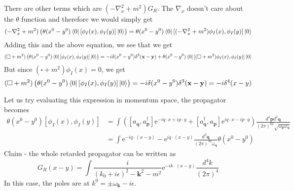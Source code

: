\documentclass[11pt]{article}
\newcommand{\e}{\mathrm{e}}
\newcommand{\w}{\omega}
\renewcommand{\a}[1]{a_\mathbf{#1}}
\newcommand{\adag}[1]{a^\dagger_\mathbf{#1}}
\numberwithin{equation}{section}
\begin{document}
    There are other terms which are \((-\nabla_x^2 + m^2) G_R\). The \(\nabla_x\) doesn't care about the \(\theta\) function and therefore we would simply get 
    \begin{equation*}
        (-\nabla_x^2 + m^2) \left(\theta(x^0 - y^0)\bra{0}[\phi_I(x), \phi_I(y) ]\ket{0}\right) = \theta(x^0 - y^0)\bra{0}[(-\nabla_x^2 + m^2)\phi_I(x), \phi_I(y) ]\ket{0}
    \end{equation*}
    Adding this and the above equation, we see that we get 
    \begin{equation*}
        (\square + m^2)\left(\theta(x^0 - y^0)\bra{0}[\phi_I(x), \phi_I(y) ]\ket{0}\right) = -i\delta(x^0 - y^0)\delta^3(\textbf{x} - \textbf{y}) + \theta(x^0 - y^0) \bra{0}[(\square + m^2)\phi_I(x), \phi_I(y) ]\ket{0}
    \end{equation*}
    But since \((\square + m^2)\phi_I(x) = 0\), we get 
    \begin{equation*}
        (\square + m^2)\left(\theta(x^0 - y^0)\bra{0}[\phi_I(x), \phi_I(y) ]\ket{0}\right) = -i\delta(x^0 - y^0)\delta^3(\textbf{x} - \textbf{y}) = -i\delta^4(x-y)
    \end{equation*}

    Let us try evaluating this expression in momentum space, the propagator becomes 
    \begin{align*}
        \theta(x^0 - y^0)[\phi_I(x), \phi_I(y)] &= \int \left(  [\a{q}, \adag{p}] \e^{-iq\cdot x + ip\cdot y} + [\adag{q}, \a{p}]\e^{iq\cdot x - ip\cdot y}  \right)\frac{d^3\textbf{p}d^3\textbf{q}}{(2\pi)^62\sqrt{\w_\textbf{p}\w_\textbf{q}}}\\
        &= \int \e^{-iq\cdot(x-y)} - \e^{iq\cdot (x-y)} \frac{d^3\textbf{q}}{(2\pi)^32\w_\textbf{q}}\theta(x^0 - y^0)
    \end{align*}
    Claim - the whole retarded propagator can be written as 
    \begin{equation*}
        G_R(x-y) = \int \frac{i}{(k_0 + i\epsilon)^2 - \textbf{k}^2 - m^2} \e^{-ik\cdot(x-y)} \frac{d^4k}{(2\pi)^4}
    \end{equation*}
    In this case, the poles are at \(k^0 = \pm \w_\textbf{k} - i\epsilon\).
\end{document}
